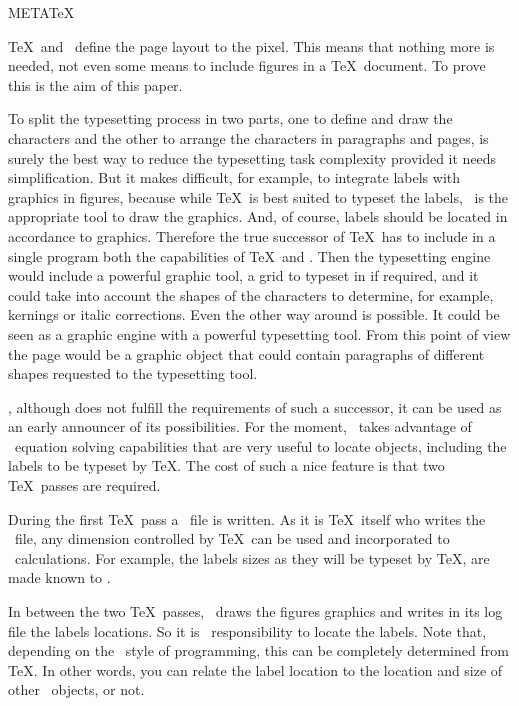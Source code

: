 \centerline{\biglogo META\bigrm\TeX}
\bigskip

\TeX\ and \MF\ define the page layout to the pixel.  This means that
nothing more is needed, not even some means to include figures in a
\TeX\ document.  To prove this is the aim of this paper.

To split the typesetting process in two parts, one to define and draw the
characters and the other to arrange the characters in paragraphs and
pages, is surely the best way to reduce the typesetting task
complexity provided it needs simplification.  But it makes
difficult, for example, to integrate labels with graphics in
figures, because while \TeX\ is best suited to typeset the labels,
\MF\ is the appropriate tool to draw the graphics.  And, of course,
labels should be located in accordance to graphics.  Therefore the
true successor of \TeX\ has to include in a single program both the
capabilities of \TeX\ and \MF.  Then the typesetting engine would
include a powerful graphic tool, a grid to typeset in if required,
and it could take into account the shapes of the characters to
determine, for example, kernings or italic corrections.  Even the
other way around is possible.  It could be seen as a graphic engine
with a powerful typesetting tool.  From this point of view the page
would be a graphic object that could contain paragraphs of different
shapes requested to the typesetting tool.

\MTeX, although does not fulfill the requirements of such a successor,
it can be used as an early announcer of its possibilities.  For the
moment, \MTeX\ takes advantage of \MF\ equation solving capabilities
that are very useful to locate objects, including the labels to be
typeset by \TeX\null.  The cost of such a nice feature is that two
\TeX\ passes are required.

During the first \TeX\ pass a \MF\ file is written.  As it is \TeX\
itself who writes the \MF\ file, any dimension controlled by \TeX\
can be used and incorporated to \MF\ calculations.  For example, the
labels sizes as they will be typeset by \TeX\null, are made known to
\MF.

In between the two \TeX\ passes, \MF\ draws the figures graphics
and writes in its log file the labels locations.  So it is \MF\
responsibility to locate the labels.  Note that, depending on the
\MF\ style of programming, this can be completely determined from
\TeX\null.  In other words, you can relate the label location to the
location and size of other \MF\ objects, or not.

